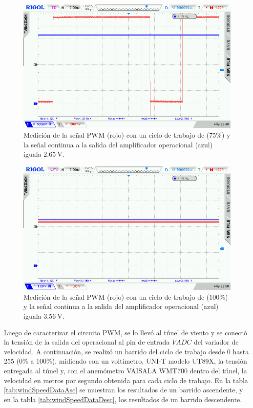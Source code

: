 \begin{figure}[H]
    \centering
    \includegraphics[width=0.9\linewidth]{Figuras/datalogger/Hardware/MedicionesPWM/191.png}
    \caption{Medición de la señal PWM (rojo) con un ciclo de trabajo de (75\%) y la señal continua a la salida del amplificador operacional (azul) iguala $\SI{2.65}{\volt}$.}
    \label{fig:191}
\end{figure}


\begin{figure}[H]
    \centering
    \includegraphics[width=0.9\linewidth]{Figuras/datalogger/Hardware/MedicionesPWM/255.png}
    \caption{Medición de la señal PWM (rojo) con un ciclo de trabajo de (100\%) y la señal continua a la salida del amplificador operacional (azul) iguala $\SI{3.56}{\volt}$.}
    \label{fig:255}
\end{figure}
Luego de caracterizar el circuito PWM, se lo llevó al túnel de viento y se conectó la tensión de la salida del operacional al pin de entrada $VADC$ del variador de velocidad. A continuación, se realizó un barrido del ciclo de trabajo desde 0 hasta 255 (0\% a 100\%), midiendo con un voltímetro, UNI-T modelo UT89X, la tensión entregada al túnel y, con el anemómetro VAISALA WMT700 dentro del túnel, la velocidad en metros por segundo obtenida para cada ciclo de trabajo. En la tabla \ref{tab:windSpeedDataAsc} se muestran los resultados de un barrido ascendente, y en la tabla \ref{tab:windSpeedDataDesc}, los resultados de un barrido descendente.

